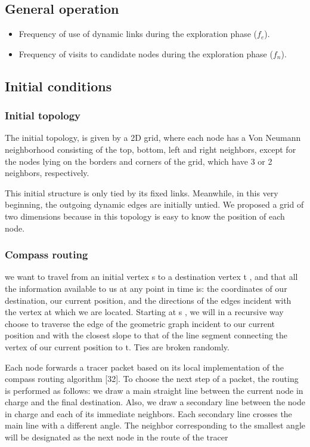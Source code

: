 \subsection{General operation}

\begin{itemize}
    \item Frequency of use of dynamic links during the exploration phase ($f_e$).
    \item Frequency of visits to candidate nodes during the exploration phase ($f_n$).
\end{itemize}

\subsection{Initial conditions}

\subsubsection{Initial topology} 
The initial topology, is given by a 2D grid, where each node has a Von Neumann neighborhood consisting of the top, bottom, left and right neighbors, except for the nodes lying on the borders and corners of the grid, which have 3 or 2 neighbors, respectively. 

This initial structure is only tied by its fixed links. Meanwhile, in this very beginning,
the outgoing dynamic edges are initially untied. We proposed a grid of two dimensions
because in this topology is easy to know the position of each node.

\subsubsection{Compass routing}

we want to travel from an initial vertex s to a destination vertex t , and that all the information available to us at any point in time is: the coordinates of our destination, our current position, and the directions of the edges incident with the vertex at which we are located. Starting at s , we will in a recursive way choose to traverse the edge of the geometric graph incident to our current position and with the closest
slope to that of the line segment connecting the vertex of our current position to t. Ties are broken randomly.

Each
node forwards a tracer packet based on its local implementation of the compass routing algorithm
[32]. To choose the next step of a packet, the routing is performed as follows: we draw a
main straight line between the current node in charge and the final destination. Also, we draw
a secondary line between the node in charge and each of its immediate neighbors. Each secondary
line crosses the main line with a different angle. The neighbor corresponding to the
smallest angle will be designated as the next node in the route of the tracer

